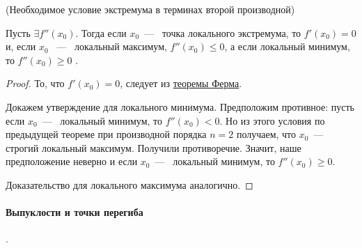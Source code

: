 \begin{theorem}
	\hypertarget{thrm5.25}{(Необходимое условие экстремума в терминах второй производной)} Пусть $\exists f''(x_{0})$. Тогда если $x_{0}$~---~ точка локального экстремума, то $f'(x_{0}) = 0$ и, если $x_{0}$ ~---~ локальный максимум, $f''(x_{0}) \leq 0$, а если локальный минимум, то $f''(x_{0}) \geq 0$ .
\end{theorem}
\begin{proof}
	То, что $f'(x_{0}) = 0$, следует из \hyperlink{thrm5.9}{теоремы Ферма}. 
	
	Докажем утверждение для локального минимума. Предположим противное: пусть если $x_{0}$~---~ локальный минимум, то $f''(x_{0}) < 0$. Но из этого условия по предыдущей теореме при производной порядка $n = 2$ получаем, что $x_{0}$~---~ строгий локальный максимум. Получили противоречие. Значит, наше предположение неверно и если $x_{0}$~---~ локальный минимум, то $f''(x_{0}) \geq 0$.
	
	Доказательство для локального максимума аналогично.  
\end{proof}

\paragraph{Выпуклости и точки перегиба}
.

